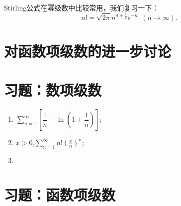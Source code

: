 Stirling公式在幂级数中比较常用，我们复习一下：
\[n!=\sqrt{2\pi}n^{n+\frac{1}{2}}e^{-n}\enspace (n\to\infty).\]
\section{对函数项级数的进一步讨论}

\section{习题：数项级数}
\begin{exercise}[判断下列正项级数的敛散性]
    \begin{enumerate}
        \item \(\displaystyle\sum\limits_{n=1}^{\infty}\left[\dfrac{1}{n}-\ln(1+\dfrac{1}{n})\right]\);
        \item \(x>0\),\enspace\(\displaystyle\sum\limits_{n=1}^{\infty}n!(\frac{x}{n})^n\);
        \item 
    \end{enumerate}
\end{exercise}
\section{习题：函数项级数}
